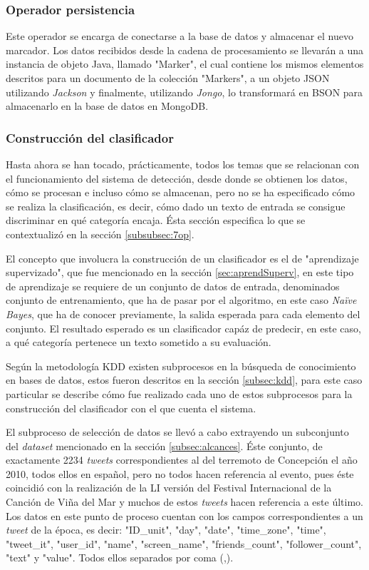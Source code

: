 \subsubsection*{Operador persistencia}
\label{subsubsec:8op}

Este operador se encarga de conectarse a la base de datos y almacenar el nuevo marcador. Los datos recibidos desde la cadena de procesamiento se llevarán a una instancia de objeto Java, llamado "Marker", el cual contiene los mismos elementos descritos para un documento de la colección "Markers", a un objeto JSON utilizando \textit{Jackson} y finalmente, utilizando \textit{Jongo}, lo transformará en BSON para almacenarlo en la base de datos en MongoDB.

\subsubsection*{Construcción del clasificador}
\label{subsubsec:clasificacion}

Hasta ahora se han tocado, prácticamente, todos los temas que se relacionan con el funcionamiento del sistema de detección, desde donde se obtienen los datos, cómo se procesan e incluso cómo se almacenan, pero no se ha especificado cómo se realiza la clasificación, es decir, cómo dado un texto de entrada se consigue discriminar en qué categoría encaja. Ésta sección especifica lo que se contextualizó en la sección \ref{subsubsec:7op}.

El concepto que involucra la construcción de un clasificador es el de "aprendizaje supervizado", que fue mencionado en la sección \ref{sec:aprendSuperv}, en este tipo de aprendizaje se requiere de un conjunto de datos de entrada, denominados conjunto de entrenamiento, que ha de pasar por el algoritmo, en este caso \textit{Naïve Bayes}, que ha de conocer previamente, la salida esperada para cada elemento del conjunto. El resultado esperado es un clasificador capáz de predecir, en este caso, a qué categoría pertenece un texto sometido a su evaluación.

Según la metodología KDD existen subprocesos en la búsqueda de conocimiento en bases de datos, estos fueron descritos en la sección \ref{subsec:kdd}, para este caso particular se describe cómo fue realizado cada uno de estos subprocesos para la construcción del clasificador con el que cuenta el sistema.

El subproceso de selección de datos se llevó a cabo extrayendo un subconjunto del \textit{dataset} mencionado en la sección \ref{subsec:alcances}. Éste conjunto, de exactamente 2234 \textit{tweets} correspondientes al del terremoto de Concepción el año 2010, todos ellos en español, pero no todos hacen referencia al evento, pues éste coincidió con la realización de la LI versión del Festival Internacional de la Canción de Viña del Mar y muchos de estos \textit{tweets} hacen referencia a este último. Los datos en este punto de proceso cuentan con los campos correspondientes a un \textit{tweet} de la época, es decir: "ID\_unit", "day", "date", "time\_zone", "time", "tweet\_it", "user\_id", "name", "screen\_name", "friends\_count", "follower\_count", "text" y "value". Todos ellos separados por coma (,).

